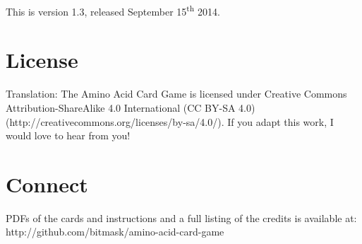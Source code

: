 \documentclass[a4paper,11pt,oneside]{memoir}
\begin{document}
This is version 1.3, released September 15\textsuperscript{th} 2014.  


\section*{License}

Translation: The Amino Acid Card Game is licensed under \cc Creative Commons Attribution-ShareAlike 4.0 International (CC BY-SA 4.0)
(http://creativecommons.org/licenses/by-sa/4.0/).
If you adapt this work, I would love to hear from you!


\section*{Connect}

PDFs of the cards and instructions and a full listing of the credits is available at: 
http://github.com/bitmask/amino-acid-card-game

\end{document}
